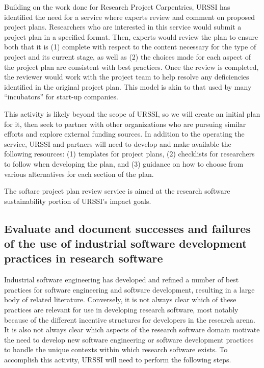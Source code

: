 \documentclass[
]{book}
\begin{document}
Building on the work done for Research Project Carpentries, URSSI has identified the need for
a service where experts review and comment on proposed project plans. Researchers who are
interested in this service would submit a project plan in a specified format. Then, experts
would review the plan to ensure both that it is (1) complete with respect to the content necessary
for the type of project and its current stage, as well as (2) the choices made for each aspect of
the project plan are consistent with best practices. Once the review is completed, the reviewer
would work with the project team to help resolve any deficiencies identified in the original
project plan. This model is akin to that used by many ``incubators'' for start-up companies.

This activity is likely beyond the scope of URSSI, so we will create an initial plan for it,
then seek to partner with other organizations who are pursuing similar efforts and explore
external funding sources. In addition to the operating the service, URSSI and partners will need
to develop and make available the following resources: (1) templates for project plans,
(2) checklists for researchers to follow when developing the plan, and (3) guidance on how
to choose from various alternatives for each section of the plan.

The softare project plan review service is aimed at the research software sustainability portion of URSSI's impact goals.

\hypertarget{evaluate-and-document-successes-and-failures-of-the-use-of-industrial-software-development-practices-in-research-software}{%
\subsection{Evaluate and document successes and failures of the use of industrial software development practices in research software}\label{evaluate-and-document-successes-and-failures-of-the-use-of-industrial-software-development-practices-in-research-software}}

Industrial software engineering has developed and refined a number of best practices for
software engineering and software development, resulting in a large body of related literature.
Conversely, it is not always clear which of these practices are relevant for use in developing
research software, most notably because of the different incentive structures for developers
in the research arena. It is also not always clear which aspects
of the research software domain motivate the need to develop new software engineering or
software development practices to handle the unique contexts within which research software
exists. To accomplish this activity, URSSI will need to perform the following steps.
\end{document}
